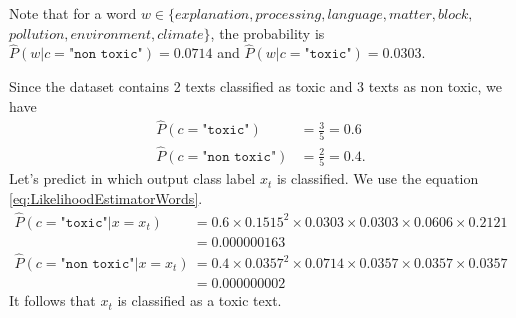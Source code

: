 \documentclass{article}
\begin{document}
Note that for a word $w \in \{explanation, processing, language, matter, block, $ $pollution, environment, climate\}$, the probability is $\widehat{P}(w | c = \texttt{"non toxic"}) = 0.0714$ and $\widehat{P}(w | c = \texttt{"toxic"}) = 0.0303$.

Since the dataset contains 2 texts classified as toxic and 3 texts as non toxic, we have
\begin{align*}
	\widehat{P}(c = \texttt{"toxic"}) &= \frac{3}{5} = 0.6 \\
	\widehat{P}(c = \texttt{"non toxic"}) &= \frac{2}{5} = 0.4.
\end{align*}
Let's predict in which output class label $x_t$ is classified. We use the equation \eqref{eq:LikelihoodEstimatorWords}.
\begin{align*}
	\widehat{P}(c = \texttt{"toxic"} | x = x_t) &= 0.6 \times 0.1515^2 \times 0.0303 \times 0.0303 \times 0.0606 \times 0.2121 \\ &= 0.000000163 \\
	\widehat{P}(c = \texttt{"non toxic"} | x = x_t) &= 0.4 \times 0.0357^2 \times 0.0714 \times 0.0357 \times 0.0357 \times 0.0357 \\ &= 0.000000002
\end{align*}
It follows that $x_t$ is classified as a toxic text.
\end{document}
